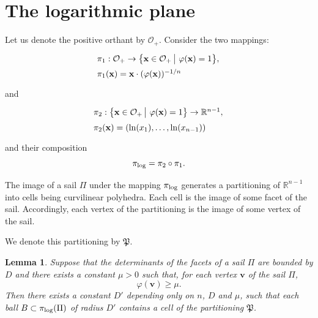 \documentclass[11pt]{article}
\theoremstyle{definition}
\theoremstyle{remark}
\theoremstyle{plain}
\newtheorem{lemma}{Lemma}
\renewcommand{\vec}[1]{\mathbf{#1}}
\renewcommand{\geq}{\geqslant}
\newcommand{\sail}{\Pi}
\newcommand{\R}{\mathbb{R}}
\newcommand{\pilog}{\pi_{\textup{log}}}
\newcommand{\partition}{\mathfrak P}
\begin{document}
  \section{The logarithmic plane}




  Let us denote the positive orthant by $\mathcal O_+$.
  Consider the two mappings:
  \[ \begin{array}{l}
       \pi_1:\mathcal O_+\rightarrow\big\{\vec x\in\mathcal O_+\,\big|\ \varphi(\vec x)=1\big\},
       \vphantom{\Big|} \\ \vphantom{\Big|}
       \pi_1(\vec x)=\vec x\cdot(\varphi(\vec x))^{-1/n}
     \end{array} \]
  and
  \[ \begin{array}{l}
       \pi_2:\big\{\vec x\in\mathcal O_+\,\big|\ \varphi(\vec x)=1\big\}\rightarrow\R^{n-1},
       \vphantom{\Big|} \\ \vphantom{\Big|}
       \pi_2(\vec x)=\left( \ln(x_1),\ldots,\ln(x_{n-1}) \right)
     \end{array} \]
  and their composition
  \[ \pilog=\pi_2\circ\pi_1. \]

  The image of a sail $\sail$ under the mapping $\pilog$ generates a partitioning of $\R^{n-1}$
  into cells being curvilinear polyhedra. Each cell is the image of some facet of the
  sail. Accordingly, each vertex of the partitioning is the image of some vertex of the sail.

  We denote this partitioning by $\partition$.

  \begin{lemma} \label{l:R_r_system}
    Suppose that the determinants of the facets of a sail $\sail$ are bounded by $D$ and
    there exists a constant $\mu>0$ such that, for each vertex $\vec v$ of the sail $\sail$,
    \[ \varphi(\vec v)\geq\mu. \]
    Then there exists a constant $D'$ depending only on $n$, $D$ and $\mu$, such that each
    ball $B\subset\pilog(\sail)$ of radius $D'$ contains a cell of the partitioning $\partition$.
  \end{lemma}
\end{document}
